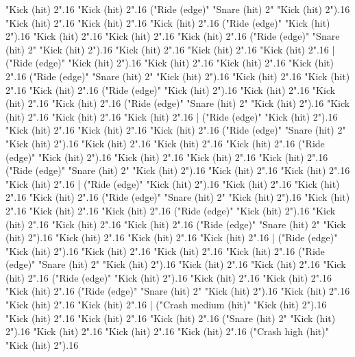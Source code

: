       "Kick (hit) 2".16
      "Kick (hit) 2".16
      ("Ride (edge)" "Snare (hit) 2" "Kick (hit) 2").16
      "Kick (hit) 2".16
      "Kick (hit) 2".16
      "Kick (hit) 2".16
      ("Ride (edge)" "Kick (hit) 2").16
      "Kick (hit) 2".16
      "Kick (hit) 2".16
      "Kick (hit) 2".16
      ("Ride (edge)" "Snare (hit) 2" "Kick (hit) 2").16
      "Kick (hit) 2".16
      "Kick (hit) 2".16
      "Kick (hit) 2".16
    |
      ("Ride (edge)" "Kick (hit) 2").16
      "Kick (hit) 2".16
      "Kick (hit) 2".16
      "Kick (hit) 2".16
      ("Ride (edge)" "Snare (hit) 2" "Kick (hit) 2").16
      "Kick (hit) 2".16
      "Kick (hit) 2".16
      "Kick (hit) 2".16
      ("Ride (edge)" "Kick (hit) 2").16
      "Kick (hit) 2".16
      "Kick (hit) 2".16
      "Kick (hit) 2".16
      ("Ride (edge)" "Snare (hit) 2" "Kick (hit) 2").16
      "Kick (hit) 2".16
      "Kick (hit) 2".16
      "Kick (hit) 2".16
    |
      ("Ride (edge)" "Kick (hit) 2").16
      "Kick (hit) 2".16
      "Kick (hit) 2".16
      "Kick (hit) 2".16
      ("Ride (edge)" "Snare (hit) 2" "Kick (hit) 2").16
      "Kick (hit) 2".16
      "Kick (hit) 2".16
      "Kick (hit) 2".16
      ("Ride (edge)" "Kick (hit) 2").16
      "Kick (hit) 2".16
      "Kick (hit) 2".16
      "Kick (hit) 2".16
      ("Ride (edge)" "Snare (hit) 2" "Kick (hit) 2").16
      "Kick (hit) 2".16
      "Kick (hit) 2".16
      "Kick (hit) 2".16
    |
      ("Ride (edge)" "Kick (hit) 2").16
      "Kick (hit) 2".16
      "Kick (hit) 2".16
      "Kick (hit) 2".16
      ("Ride (edge)" "Snare (hit) 2" "Kick (hit) 2").16
      "Kick (hit) 2".16
      "Kick (hit) 2".16
      "Kick (hit) 2".16
      ("Ride (edge)" "Kick (hit) 2").16
      "Kick (hit) 2".16
      "Kick (hit) 2".16
      "Kick (hit) 2".16
      ("Ride (edge)" "Snare (hit) 2" "Kick (hit) 2").16
      "Kick (hit) 2".16
      "Kick (hit) 2".16
      "Kick (hit) 2".16
    |
      ("Ride (edge)" "Kick (hit) 2").16
      "Kick (hit) 2".16
      "Kick (hit) 2".16
      "Kick (hit) 2".16
      ("Ride (edge)" "Snare (hit) 2" "Kick (hit) 2").16
      "Kick (hit) 2".16
      "Kick (hit) 2".16
      "Kick (hit) 2".16
      ("Ride (edge)" "Kick (hit) 2").16
      "Kick (hit) 2".16
      "Kick (hit) 2".16
      "Kick (hit) 2".16
      ("Ride (edge)" "Snare (hit) 2" "Kick (hit) 2").16
      "Kick (hit) 2".16
      "Kick (hit) 2".16
      "Kick (hit) 2".16
    |
      ("Crash medium (hit)" "Kick (hit) 2").16
      "Kick (hit) 2".16
      "Kick (hit) 2".16
      "Kick (hit) 2".16
      ("Snare (hit) 2" "Kick (hit) 2").16
      "Kick (hit) 2".16
      "Kick (hit) 2".16
      "Kick (hit) 2".16
      ("Crash high (hit)" "Kick (hit) 2").16
